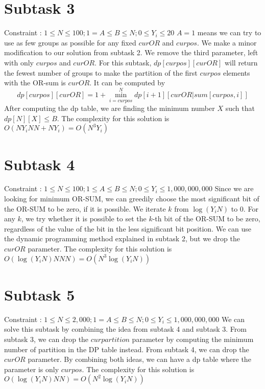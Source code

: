 \documentclass[a4paper,11pt]{article}
\begin{document}
\section{Subtask 3}
Constraint : $1\leq N \leq 100; 1 = A \leq B \leq N; 0 \leq Y_i \leq 20$\newline
$A = 1$ means we can try to use as few groups as possible for any fixed $curOR$ and $curpos$. We make a minor modification to our solution from subtask 2. We remove the third parameter, left with only $curpos$ and $curOR$. For this subtask, $dp[curpos][curOR]$ will return the fewest number of groups to make the partition of the first $curpos$ elements with the OR-sum is $curOR$. It can be computed by
\[dp[curpos][curOR] = 1 + \min_{i=curpos}^{N}dp[i+1][curOR | sum[curpos,i]] \]
After computing the dp table, we are finding the minimum number $X$ such that $dp[N][X] \leq B$. The complexity for this solution is $O(NY_iNN + NY_i) = O(N^3Y_i)$

\section{Subtask 4}
Constraint : $1\leq N \leq 100; 1 \leq A \leq B \leq N; 0 \leq Y_i \leq 1,000,000,000$\newline
Since we are looking for minimum OR-SUM, we can greedily choose the most significant bit of the OR-SUM to be zero, if it is possible. We iterate $k$ from $\log(Y_iN)$ to $0$. For any $k$, we try whether it is possible to set the $k$-th bit of the OR-SUM to be zero, regardless of the value of the bit in the less significant bit position. We can use the dynamic programming method explained in subtask 2, but we drop the $curOR$ parameter. The complexity for this solution is $O(\log(Y_iN)NNN) = O(N^3\log(Y_iN))$

\section{Subtask 5}
Constraint : $1\leq N \leq 2,000; 1 = A \leq B \leq N; 0 \leq Y_i \leq 1,000,000,000$\newline
We can solve this subtask by combining the idea from subtask 4 and subtask 3. From subtask 3, we can drop the $curpartition$ parameter by computing the minimum number of partition in the DP table instead. From subtask 4, we can drop the $curOR$ parameter. By combining both ideas, we can have a dp table where the parameter is only $curpos$. The complexity for this solution is $O(\log(Y_iN)NN) = O(N^2\log(Y_iN))$
\end{document}
